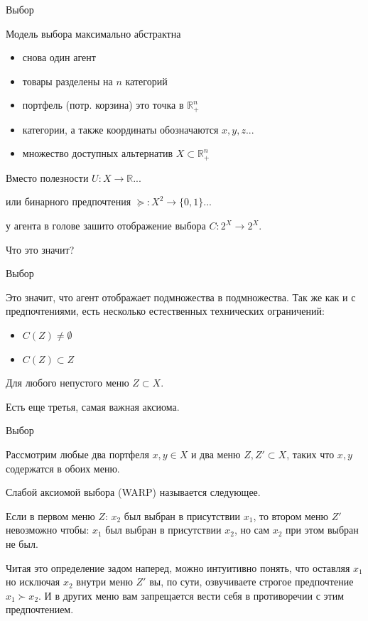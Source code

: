 \documentclass{beamer}
\begin{document}
\begin{frame}{Выбор}

Модель выбора максимально абстрактна

\begin{itemize}
\item снова один агент
\item товары разделены на $n$ категорий
\item портфель (потр. корзина) это точка в $\mathbb{R}_{+}^{n}$	
\item категории, а также координаты обозначаются $x, y, z...$
\item множество доступных альтернатив $X \subset \mathbb{R}_{+}^{n}$
\end{itemize}

Вместо полезности $U: X \to \mathbb{R}$...

или бинарного предпочтения $\succcurlyeq: X^2 \to \{0,1\}$...

у агента в голове зашито \alert{отображение выбора} $C: 2^X \to 2^X$. 

Что это значит?

\end{frame}

\begin{frame}{Выбор}

Это значит, что агент отображает подмножества в подмножества. Так же как и с предпочтениями, есть несколько естественных технических ограничений:

\begin{itemize}
  \item $C(Z) \neq \emptyset$
  \item $C(Z) \subset Z$
\end{itemize}

Для любого непустого меню $Z \subset X$. 

Есть еще третья, самая важная аксиома.

\end{frame}

\begin{frame}{Выбор}

Рассмотрим любые два портфеля $x, y \in X$ и два меню $Z,Z' \subset X$, таких что $x,y$ содержатся в обоих меню.

\begin{definition} 
\alert{Слабой аксиомой выбора} (WARP) называется следующее. 

Если в первом меню $Z$: $x_2$ был выбран в присутствии $x_1$, то втором меню $Z'$ невозможно чтобы: $x_1$ был выбран в присутствии $x_2$, но сам $x_2$ при этом выбран не был.
\end{definition}

Читая это определение задом наперед, можно интуитивно понять, что оставляя $x_1$ но исключая $x_2$ внутри меню $Z'$ вы, по сути, озвучиваете строгое предпочтение $x_1 \succ x_2$. И в других меню вам запрещается вести себя в противоречии с этим предпочтением.

\end{frame}
\end{document}
